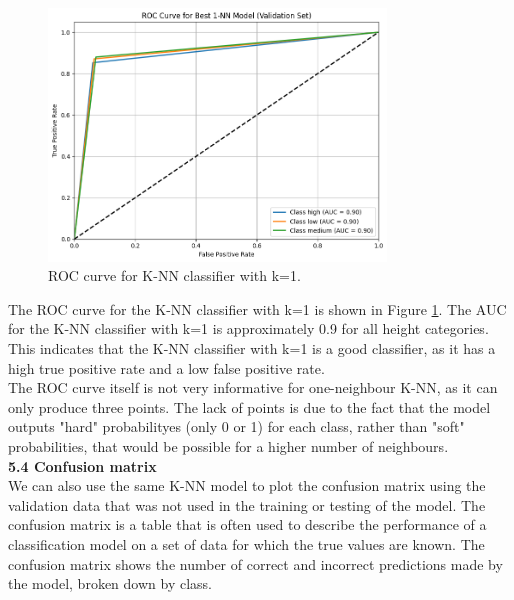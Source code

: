 \documentclass[12pt]{article}
\begin{document}
\begin{figure}[H]
\centering
\includegraphics[width=0.8\textwidth]{figures/knn_roc_curve.png}
\caption{ROC curve for K-NN classifier with k=1.}
\label{fig:knn_roc_curve}
\end{figure}

The ROC curve for the K-NN classifier with k=1 is shown in Figure \ref{fig:knn_roc_curve}. The AUC for the K-NN classifier with k=1 is approximately 0.9 for all height categories. This indicates that the K-NN classifier with k=1 is a good classifier, as it has a high true positive rate and a low false positive rate. 
\\
The ROC curve itself is not very informative for one-neighbour K-NN, as it can only produce three points. The lack of points is due to the fact that the model outputs "hard" probabilityes (only 0 or 1) for each class, rather than "soft" probabilities, that would be possible for a higher number of neighbours. 
\\

\textbf{5.4 Confusion matrix}
\\
We can also use the same K-NN model to plot the confusion matrix using the validation data that was not used in the training or testing of the model. The confusion matrix is a table that is often used to describe the performance of a classification model on a set of data for which the true values are known. The confusion matrix shows the number of correct and incorrect predictions made by the model, broken down by class.
\end{document}
